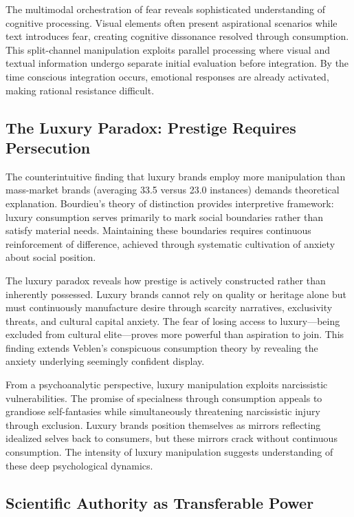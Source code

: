 The multimodal orchestration of fear reveals sophisticated understanding of cognitive processing. Visual elements often present aspirational scenarios while text introduces fear, creating cognitive dissonance resolved through consumption. This split-channel manipulation exploits parallel processing where visual and textual information undergo separate initial evaluation before integration. By the time conscious integration occurs, emotional responses are already activated, making rational resistance difficult.

\subsection{The Luxury Paradox: Prestige Requires Persecution}

The counterintuitive finding that luxury brands employ more manipulation than mass-market brands (averaging 33.5 versus 23.0 instances) demands theoretical explanation. Bourdieu's theory of distinction provides interpretive framework: luxury consumption serves primarily to mark social boundaries rather than satisfy material needs. Maintaining these boundaries requires continuous reinforcement of difference, achieved through systematic cultivation of anxiety about social position.

The luxury paradox reveals how prestige is actively constructed rather than inherently possessed. Luxury brands cannot rely on quality or heritage alone but must continuously manufacture desire through scarcity narratives, exclusivity threats, and cultural capital anxiety. The fear of losing access to luxury—being excluded from cultural elite—proves more powerful than aspiration to join. This finding extends Veblen's conspicuous consumption theory by revealing the anxiety underlying seemingly confident display.

From a psychoanalytic perspective, luxury manipulation exploits narcissistic vulnerabilities. The promise of specialness through consumption appeals to grandiose self-fantasies while simultaneously threatening narcissistic injury through exclusion. Luxury brands position themselves as mirrors reflecting idealized selves back to consumers, but these mirrors crack without continuous consumption. The intensity of luxury manipulation suggests understanding of these deep psychological dynamics.

\subsection{Scientific Authority as Transferable Power}

